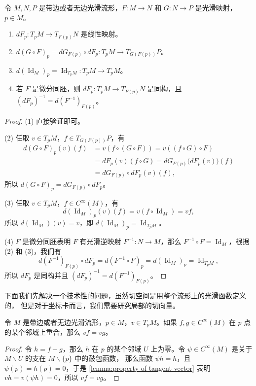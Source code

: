 \documentclass[fontset=none]{Notes}
\DeclareMathOperator\Id{Id}
\begin{document}
\begin{proposition}[微分的性质]
  令 $M,N,P$ 是带边或者无边光滑流形，$F:M\to N$ 和 $G:N\to P$ 是光滑映射，
  $p\in M$。 
  \begin{enumerate}
    \item $dF_p:T_pM\to T_{F(p)}N$ 是线性映射。
    \item $d(G\circ F)_p=dG_{F(p)}\circ dF_p:T_pM\to T_{G(F(p))}P$。
    \item $d(\Id_M)_p=\Id_{T_pM}:T_pM\to T_pM$。
    \item 若 $F$ 是微分同胚，则 $dF_p:T_pM\to T_{F(p)}N$ 是同构，且
    $(dF_p)^{-1}=d(F^{-1})_{F(p)}$。
  \end{enumerate}
\end{proposition}
\begin{proof}
  (1) 直接验证即可。

  (2) 任取 $v\in T_pM$，$f\in T_{G(F(p))}P$，有
  \begin{align*}
    d(G\circ F)_p(v)(f)&=v(f\circ (G\circ F))=v((f\circ G)\circ F)\\
    &=dF_p(v)(f\circ G)=dG_{F(p)}\bigl(dF_p(v)\bigr)(f)\\
    &=dG_{F(p)}\circ dF_p(v)(f),
  \end{align*}
  所以 $d(G\circ F)_p=dG_{F(p)}\circ dF_p$。

  (3) 任取 $v\in T_pM$，$f\in C^\infty(M)$，有
  \[
    d(\Id_M)_p(v)(f)=v(f\circ\Id_M)=vf,  
  \]
  所以 $d(\Id_M)(v)=v$，即 $d(\Id_M)_p=\Id_{T_pM}$。

  (4) $F$ 是微分同胚表明 $F$ 有光滑逆映射 $F^{-1}:N\to M$，那么
  $F^{-1}\circ F=\Id_M$，根据 (2) 和 (3)，我们有
  \[
    d(F^{-1})_{F(p)}\circ dF_p=d(F^{-1}\circ F)_p=d(\Id_M)_p=\Id_{T_pM},
  \] 
  所以 $dF_p$ 是同构并且 $(dF_p)^{-1}=d(F^{-1})_{F(p)}$。
\end{proof}

下面我们先解决一个技术性的问题，虽然切空间是用整个流形上的光滑函数定义的，
但是对于坐标卡而言，我们需要研究局部的切向量。

\begin{proposition}\label{prop:local property of tangent vector}
  令 $M$ 是带边或者无边光滑流形，$p\in M$，$v\in T_pM$。如果 $f,g\in C^\infty(M)$
  在 $p$ 点的某个邻域上重合，那么 $vf=vg$。
\end{proposition}
\begin{proof}
  令 $h=f-g$，那么 $h$ 在 $p$ 的某个邻域 $U$ 上为零。令 $\psi\in C^\infty(M)$
  是关于 $M\smallsetminus U$ 的支在 $M\smallsetminus \{p\}$ 中的鼓包函数，
  那么函数 $\psi h=h$，且 $\psi(p)=h(p)=0$，于是 \autoref{lemma:property of tangent vector}
  表明 $v h=v(\psi h)=0$，所以 $vf=vg$。
\end{proof}
\end{document}
